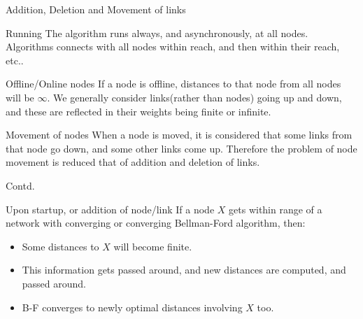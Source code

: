\begin{frame}{Addition, Deletion and Movement of links}

\begin{block}{Running}
The algorithm runs always, and asynchronously, at all nodes. Algorithms connects with all nodes within reach, and then within their reach, etc..
\end{block}

\begin{block}{Offline/Online nodes}
If a node is offline, distances to that node from all nodes will be $\infty$. 
We generally consider links(rather than nodes) going up and down, and these are reflected in their weights
being finite or infinite. 
\end{block}

\begin{block}{Movement of nodes}
When a node is moved, it is considered that some links from that node go down, and some other links come up. Therefore the problem
of node movement is reduced that of addition and deletion of links.
\end{block}
\end{frame}

\begin{frame}{Contd.}

\begin{block}{Upon startup, or addition of node/link}
If a node $X$ gets within range of a network with converging or converging Bellman-Ford algorithm, then:
\begin{itemize}
\item Some distances to $X$ will become finite.
\item This information gets passed around, and new distances are computed, and passed around.
\item B-F converges to newly optimal distances involving $X$ too.
\end{itemize}
\end{block}

\end{frame}


